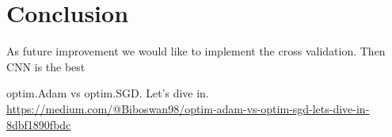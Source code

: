 \documentclass[journal, a4paper]{IEEEtran}
\begin{document}
\section{Conclusion}
\label{sec:conclusion}
As future improvement we would like to implement the cross validation.
Then CNN is the best %



\begin{thebibliography}{999}

    	optim.Adam vs optim.SGD. Let’s dive in.
    	\url{https://medium.com/@Biboswan98/optim-adam-vs-optim-sgd-lets-dive-in-8dbf1890fbdc}
	
	    

\end{thebibliography}

\end{document}
